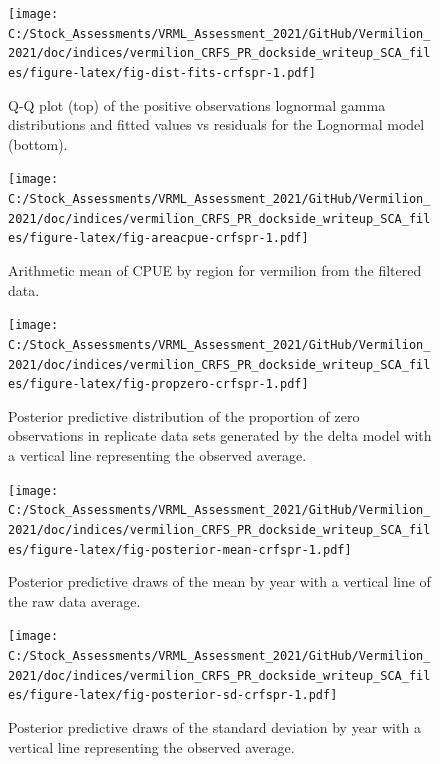 \documentclass[11pt,
  english,
  a4paper,
]{article}
\begin{document}
\FloatBarrier

\FloatBarrier

\begin{figure}
\centering
\texttt{[image: C:/Stock\_Assessments/VRML\_Assessment\_2021/GitHub/Vermilion\_2021/doc/indices/vermilion\_CRFS\_PR\_dockside\_writeup\_SCA\_files/figure-latex/fig-dist-fits-crfspr-1.pdf]}
\caption{\label{fig:fig-dist-fits-crfspr}Q-Q plot (top) of the positive observations lognormal gamma distributions and fitted values vs residuals for the Lognormal model (bottom).}
\end{figure}

\begin{figure}
\centering
\texttt{[image: C:/Stock\_Assessments/VRML\_Assessment\_2021/GitHub/Vermilion\_2021/doc/indices/vermilion\_CRFS\_PR\_dockside\_writeup\_SCA\_files/figure-latex/fig-areacpue-crfspr-1.pdf]}
\caption{\label{fig:fig-areacpue-crfspr}Arithmetic mean of CPUE by region for vermilion from the filtered data.}
\end{figure}

\begin{figure}
\centering
\texttt{[image: C:/Stock\_Assessments/VRML\_Assessment\_2021/GitHub/Vermilion\_2021/doc/indices/vermilion\_CRFS\_PR\_dockside\_writeup\_SCA\_files/figure-latex/fig-propzero-crfspr-1.pdf]}
\caption{\label{fig:fig-propzero-crfspr}Posterior predictive distribution of the proportion of zero observations in replicate data sets generated by the delta model with a vertical line representing the observed average.}
\end{figure}

\begin{figure}
\centering
\texttt{[image: C:/Stock\_Assessments/VRML\_Assessment\_2021/GitHub/Vermilion\_2021/doc/indices/vermilion\_CRFS\_PR\_dockside\_writeup\_SCA\_files/figure-latex/fig-posterior-mean-crfspr-1.pdf]}
\caption{\label{fig:fig-posterior-mean-crfspr}Posterior predictive draws of the mean by year with a vertical line of the raw data average.}
\end{figure}

\begin{figure}
\centering
\texttt{[image: C:/Stock\_Assessments/VRML\_Assessment\_2021/GitHub/Vermilion\_2021/doc/indices/vermilion\_CRFS\_PR\_dockside\_writeup\_SCA\_files/figure-latex/fig-posterior-sd-crfspr-1.pdf]}
\caption{\label{fig:fig-posterior-sd-crfspr}Posterior predictive draws of the standard deviation by year with a vertical line representing the observed average.}
\end{figure}
\end{document}
